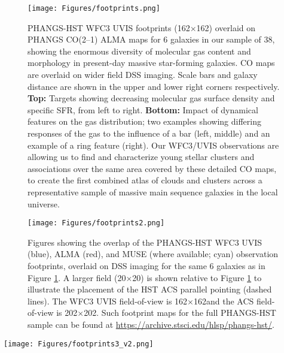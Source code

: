 \begin{figure}[t!]
\texttt{[image: Figures/footprints.png]}
 \caption{PHANGS-HST WFC3 UVIS footprints (162\arcsec$\times$162\arcsec) overlaid on PHANGS \mbox{CO(2--1)} ALMA maps for 6 galaxies in our sample of 38, showing the enormous diversity  of  molecular  gas  content  and  morphology  in  present-day  massive  star-forming  galaxies.    CO maps are overlaid on wider field DSS imaging.  Scale bars and galaxy distance are shown in the upper and lower right corners respectively. \textbf{Top:}  Targets showing decreasing molecular gas surface  density and specific SFR, from left to  right. \textbf{Bottom:} Impact of dynamical features on the gas distribution; two examples showing differing responses of the  gas  to  the  influence of a bar  (left,  middle)  and an  example  of  a  ring  feature  (right).  Our  WFC3/UVIS observations are allowing us to find and characterize young stellar clusters and associations over the same area  covered  by these detailed CO maps, to create the  first  combined  atlas  of clouds  and clusters across a representative sample of massive main sequence galaxies in the local universe. }
 \label{fig:footprints}
\end{figure}

\begin{figure}[t!]
\texttt{[image: Figures/footprints2.png]}
 \caption{Figures showing the overlap of the PHANGS-HST WFC3 UVIS (blue), ALMA (red), and MUSE (where available; cyan) observation footprints, overlaid on DSS imaging for the same 6 galaxies as in Figure \ref{fig:footprints}.  A larger field (20\arcmin$\times$20\arcmin) is shown relative to Figure \ref{fig:footprints} to illustrate the placement of the HST ACS parallel pointing (dashed lines).  The WFC3 UVIS field-of-view is 162\arcsec$\times$162\arcsec and the ACS field-of-view is 202\arcsec$\times$202\arcsec.  Such footprint maps for the full PHANGS-HST sample can be found at \url{https://archive.stsci.edu/hlsp/phangs-hst/}.}
 \label{fig:footprints2}
\end{figure}

\begin{figure*}
\texttt{[image: Figures/footprints3\_v2.png]}
 \caption{Color composites of PHANGS-HST imaging (Red: WFC3/UVIS F814W,
Green: WFC3/UVIS F555W, Blue: WFC3/UVIS F438W+F336W+F275W), overlaid on DSS imaging for the same 6 galaxies as in Figures \ref{fig:footprints} and \ref{fig:footprints2}.}
 \label{fig:footprints3}
\end{figure*}